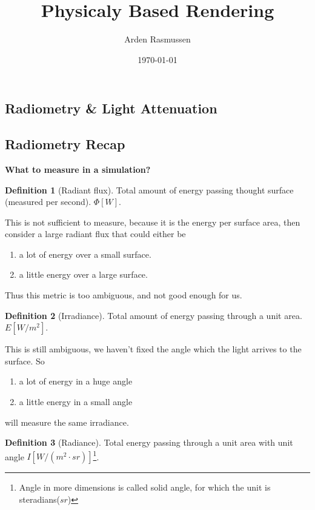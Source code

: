 \documentclass[10pt]{armath}
\title{Physicaly Based Rendering}
\author{Arden Rasmussen}
\date{\today}
\numberwithin{equation}{section}
\theoremstyle{definition}
\newtheorem{definition}{Definition}[section]
\begin{document}
\maketitle

\begin{multicols}{2}
  \section{Radiometry \& Light Attenuation}%
  \label{sec:radiometry_&_light_attenuation}

  \subsection{Radiometry Recap}%
  \label{sub:radiometry_recap}

  \textbf{What to measure in a simulation?}

  \begin{definition}[Radiant flux]
    Total amount of energy passing thought surface (measured per second).
    $\Phi\left[W\right]$.
  \end{definition}

  This is not sufficient to measure, because it is the energy per surface area,
  then consider a large radiant flux that could either be
  \begin{enumerate}
    \item a lot of energy over a small surface.
    \item a little energy over a large surface.
  \end{enumerate}

  Thus this metric is too ambiguous, and not good enough for us.

  \begin{definition}[Irradiance]
    Total amount of energy passing through a unit area. $E\left[W/m^2\right]$.
  \end{definition}

  This is still ambiguous, we haven't fixed the angle which the light arrives to the
  surface. So
  \begin{enumerate}
    \item a lot of energy in a huge angle
    \item a little energy in a small angle
  \end{enumerate}
  will measure the same irradiance.

  \begin{definition}[Radiance]
    Total energy passing through a unit area with unit angle
    $I\left[W/\left(m^2\cdot sr\right)\right]$\footnote{Angle in more dimensions
      is called solid angle, for which the unit is steradians($sr$)}.
  \end{definition}


\end{multicols}
\end{document}
